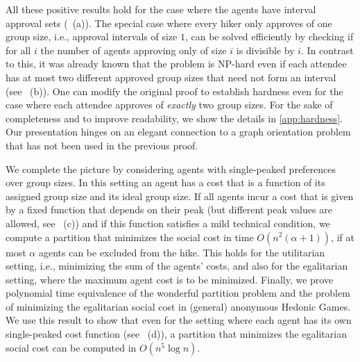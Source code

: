 \documentclass[a4paper,UKenglish,cleveref, autoref, thm-restate]{lipics-v2021}
\begin{document}
All these positive results hold for the case where the agents have interval approval sets (~(a)). The special case where every hiker only approves of one group size, i.e., approval intervals of size $1$, 
can be solved efficiently by checking if for all $i$ the number of agents approving only of size $i$ is divisible by $i.$
In contrast to this, it was already known that the problem is NP-hard even if each attendee has at most two different approved group sizes that need not form an interval~\cite{Darmann_journal} (see ~(b)). One can modify the original proof to establish hardness even for the case where each attendee approves of \emph{exactly} two group sizes. For the sake of completeness and to improve readability, we show the details in \cref{app:hardness}. Our presentation hinges on an elegant connection to a graph orientation problem that has not been used in the previous proof.

We complete the picture by considering agents with single-peaked preferences over group sizes. In this setting an agent has a cost that is a function of its assigned group size and its ideal group size. If all agents incur a cost that is given by a fixed function that depends on their peak (but different peak values are allowed, see ~(c)) and if this function satisfies a mild technical condition, we compute a partition that minimizes the social cost in time $O(n^2(\alpha+1))$, if at most $\alpha$ agents can be excluded from the hike. This holds for the utilitarian setting, i.e., minimizing the sum of the agents' costs, and also for the egalitarian setting, where the maximum agent cost is to be minimized. Finally, we prove polynomial time equivalence of the wonderful partition problem and the problem of minimizing the egalitarian social cost in (general) anonymous Hedonic Games. We use this result to show that even for the setting where each agent has its own single-peaked cost function (see ~(d)), a partition that minimizes the egalitarian social cost can be computed in $O(n^5\log n)$. 


\end{document}
